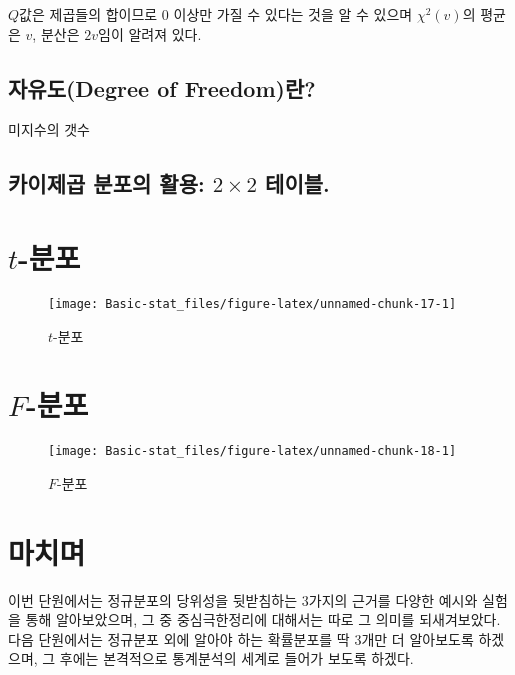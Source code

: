 \documentclass[]{book}
\begin{document}
\(Q\)값은 제곱들의 합이므로 0 이상만 가질 수 있다는 것을 알 수 있으며
\(\chi^2(v)\)의 평균은 \(v\), 분산은 \(2v\)임이 알려져 있다.

\subsection{자유도(Degree of
Freedom)란?}\label{uxc790uxc720uxb3c4degree-of-freedomuxb780}

미지수의 갯수

\subsection{\texorpdfstring{카이제곱 분포의 활용: \(2\times2\)
테이블.}{카이제곱 분포의 활용: 2\textbackslash{}times2 테이블.}}\label{uxce74uxc774uxc81cuxacf1-uxbd84uxd3ecuxc758-uxd65cuxc6a9-2times2-uxd14cuxc774uxbe14.}

\section{\texorpdfstring{\(t\)-분포}{t-분포}}\label{t-uxbd84uxd3ec}

\begin{figure}

{\centering \texttt{[image: Basic-stat\_files/figure-latex/unnamed-chunk-17-1]} 

}

\caption{$t$-분포}\label{fig:unnamed-chunk-17}
\end{figure}

\section{\texorpdfstring{\(F\)-분포}{F-분포}}\label{f-uxbd84uxd3ec}

\begin{figure}

{\centering \texttt{[image: Basic-stat\_files/figure-latex/unnamed-chunk-18-1]} 

}

\caption{$F$-분포}\label{fig:unnamed-chunk-18}
\end{figure}

\section{마치며}\label{uxb9c8uxce58uxba70-2}

이번 단원에서는 정규분포의 당위성을 뒷받침하는 3가지의 근거를 다양한
예시와 실험을 통해 알아보았으며, 그 중 중심극한정리에 대해서는 따로 그
의미를 되새겨보았다. 다음 단원에서는 정규분포 외에 알아야 하는
확률분포를 딱 3개만 더 알아보도록 하겠으며, 그 후에는 본격적으로
통계분석의 세계로 들어가 보도록 하겠다.
\end{document}
